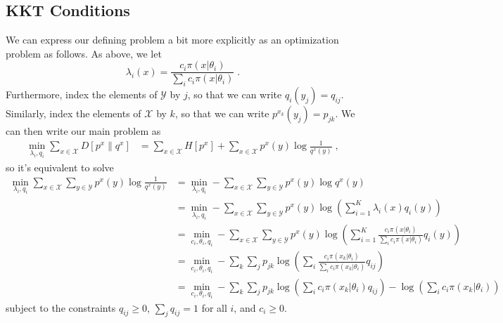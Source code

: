 \documentclass[english]{scrartcl}
\begin{document}
	\subsection{KKT Conditions}
		We can express our defining problem a bit more explicitly as an optimization problem as follows. As above, we let
		\begin{equation}
			\lambda_i(x) = \frac{c_i\pi(x|\theta_i)}{\sum_ic_i\pi(x|\theta_i)}\;.
		\end{equation}
		Furthermore, index the elements of $\mathcal{Y}$ by $j$, so that we can write $q_i(y_j) = q_{ij}$. Similarly, index the elements of $\mathcal{X}$ by $k$, so that we can write $p^{x_k}(y_j) = p_{jk}$. We can then write our main problem as
		\begin{align}
			\min_{\lambda_i, q_i} \sum_{x \in \mathcal{X}} D[p^x\|q^x] &= \sum_{x\in \mathcal{X}} H[p^x] + \sum_{x \in \mathcal{X}}p^x(y)\log\frac{1}{q^x(y)}\;,
		\end{align}
		so it's equivalent to solve
		\begin{align}
			\min_{\lambda_i, q_i}\sum_{x \in \mathcal{X}}\sum_{y \in \mathcal{Y}} p^x(y)\log\frac{1}{q^x(y)} &= \min_{\lambda_i, q_i} - \sum_{x \in \mathcal{X}} \sum_{y \in \mathcal{Y}} p^x(y)\log q^x(y) \\
			&= \min_{\lambda_i, q_i} - \sum_{x \in \mathcal{X}} \sum_{y \in \mathcal{Y}} p^x(y)\log \left(\sum_{i=1}^K \lambda_i(x) q_i(y)\right) \\
			&= \min_{c_i, \theta_i, q_i} - \sum_{x \in \mathcal{X}}\sum_{y \in \mathcal{Y}}p^x(y)\log \left(\sum_{i=1}^K \frac{c_i\pi(x|\theta_i)}{\sum_ic_i\pi(x|\theta_i)} q_i(y)\right) \\
			&= \min_{c_i, \theta_i, q_i} - \sum_{k}\sum_{j}p_{jk}\log \left(\sum_{i} \frac{c_i\pi(x_k|\theta_i)}{\sum_ic_i\pi(x_k|\theta_i)} q_{ij}\right) \\
			&= \min_{c_i, \theta_i, q_i} - \sum_{k}\sum_{j}p_{jk}\log \left(\sum_{i} c_i\pi(x_k|\theta_i) q_{ij}\right) - \log\left(\sum_ic_i\pi(x_k|\theta_i) \right)
		\end{align}
		subject to the constraints $q_{ij} \geq 0$, $\sum_jq_{ij} = 1$ for all $i$, and $c_i \geq 0$.


\end{document}
